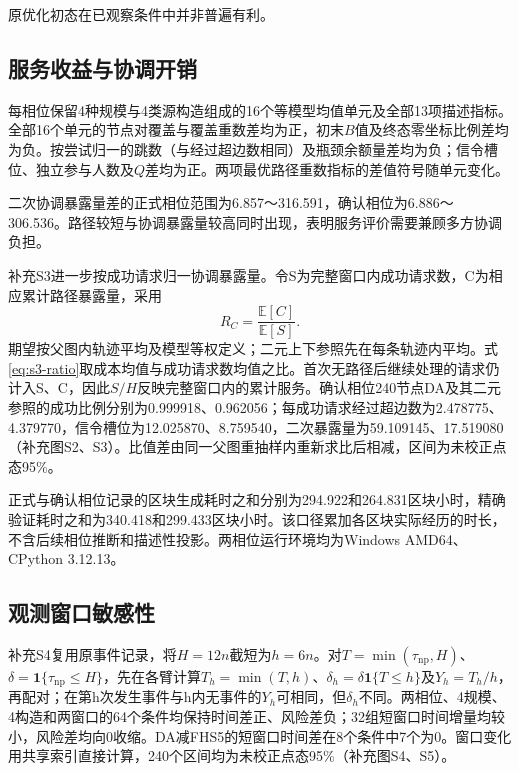 \documentclass[UTF8,a4paper,twocolumn,fontset=none,zihao=5]{ctexart}
\begin{document}
原优化初态在已观察条件中并非普遍有利。


\subsection{服务收益与协调开销}

每相位保留4种规模与4类源构造组成的16个等模型均值单元及全部13项描述指标。全部16个单元的节点对覆盖与覆盖重数差均为正，初末$B$值及终态零坐标比例差均为负。按尝试归一的跳数（与经过超边数相同）及瓶颈余额量差均为负；信令槽位、独立参与人数及$Q$差均为正。两项最优路径重数指标的差值符号随单元变化。


二次协调暴露量差的正式相位范围为6.857～316.591，确认相位为6.886～306.536。路径较短与协调暴露量较高同时出现，表明服务评价需要兼顾多方协调负担。



补充S3进一步按成功请求归一协调暴露量。令S为完整窗口内成功请求数，C为相应累计路径暴露量，采用
\begin{equation}
R_C=\frac{\mathbb E[C]}{\mathbb E[S]}.
\label{eq:s3-ratio}
\end{equation}
期望按父图内轨迹平均及模型等权定义；二元上下参照先在每条轨迹内平均。式\ref{eq:s3-ratio}取成本均值与成功请求数均值之比。首次无路径后继续处理的请求仍计入S、C，因此$S/H$反映完整窗口内的累计服务。确认相位240节点DA及其二元参照的成功比例分别为0.999918、0.962056；每成功请求经过超边数为2.478775、4.379770，信令槽位为12.025870、8.759540，二次暴露量为59.109145、17.519080（补充图S2、S3）。比值差由同一父图重抽样内重新求比后相减，区间为未校正点态95\%。


正式与确认相位记录的区块生成耗时之和分别为294.922和264.831区块小时，精确验证耗时之和为340.418和299.433区块小时。该口径累加各区块实际经历的时长，不含后续相位推断和描述性投影。两相位运行环境均为Windows AMD64、CPython 3.12.13。



\subsection{观测窗口敏感性}

补充S4复用原事件记录，将$H=12n$截短为$h=6n$。对$T=\min(\tau_{\mathrm{np}},H)$、$\delta=\mathbf1\{\tau_{\mathrm{np}}\leq H\}$，先在各臂计算$T_h=\min(T,h)$、$\delta_h=\delta\mathbf1\{T\leq h\}$及$Y_h=T_h/h$，再配对；在第h次发生事件与h内无事件的$Y_h$可相同，但$\delta_h$不同。两相位、4规模、4构造和两窗口的64个条件均保持时间差正、风险差负；32组短窗口时间增量均较小，风险差均向0收缩。DA减FHS5的短窗口时间差在8个条件中7个为0。窗口变化用共享索引直接计算，240个区间均为未校正点态95\%（补充图S4、S5）。
\end{document}
